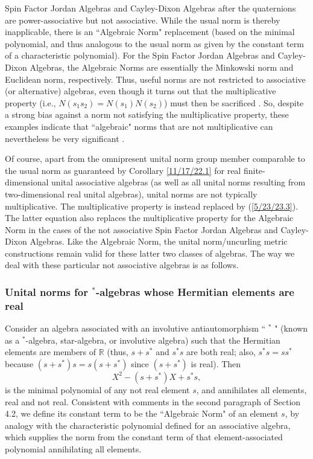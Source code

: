 \documentclass{amsart}
\numberwithin{equation}{section}
\theoremstyle{definition}
\numberwithin{theorem}{section}
\begin{document}
Spin Factor Jordan Algebras and Cayley-Dixon Algebras after the quaternions are power-associative but not associative.  While the usual norm is thereby inapplicable, there is an ``Algebraic Norm" replacement \cite{jacobson:1963} (based on the minimal polynomial, and thus analogous to the usual norm as given by the constant term of a characteristic polynomial).  For the Spin Factor Jordan Algebras and Cayley-Dixon Algebras, the Algebraic Norms are essentially the  Minkowski  norm and Euclidean norm, respectively.  Thus, useful norms are not restricted to associative (or alternative) algebras, even though it turns out that the multiplicative property (i.e., $N(s_1s_2)=N(s_1)N(s_2)$) must then be sacrificed  \cite{schafer:1963}. 
So, despite a strong bias against a norm not satisfying the multiplicative property, these examples indicate that ``algebraic" norms that are not multiplicative can nevertheless be very significant \cite{mccrimmon:2004}. 

Of course, apart from the omnipresent unital norm group member comparable to the usual norm as guaranteed by Corollary \ref{11/17/22.1} for real finite-dimensional unital associative algebras (as well as all unital norms resulting from two-dimensional real unital algebras), unital norms are not typically multiplicative.  The multiplicative property is instead replaced by (\ref{5/23/23.3}).  The latter equation also replaces the multiplicative property for the Algebraic Norm in the cases of the not associative Spin Factor Jordan Algebras and Cayley-Dixon Algebras. 
Like the Algebraic Norm, the unital norm/uncurling metric constructions remain valid for these latter two classes of algebras.  The way we deal with these particular not associative algebras is as follows.

\subsubsection{Unital norms for $^*$-algebras whose Hermitian elements are real} 

Consider an algebra associated with an involutive antiautomorphism ``
$^*$ " (known as a $^*$-algebra, star-algebra, or involutive algebra) such that the Hermitian elements are members of $\mathbb{R}$ (thus, $s+s^*$ and $s^*s$ are both real; also, $s^*s = ss^*$ because $(s+s^*)s = s(s+s^*)$ since $(s+s^*)$ is real). 
Then \[ X^2 - (s+s^*)X + s^*s, \] is the minimal polynomial of any not real element $s$, and annihilates all elements, real and not real.  Consistent with comments in the second paragraph of Section 4.2, we define its constant term to be the ``Algebraic Norm" of an element $s$, by analogy with the characteristic polynomial defined for an associative algebra, which supplies the norm from the constant term of that element-associated polynomial annihilating all elements.
\end{document}
